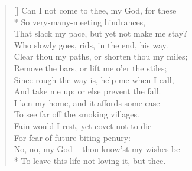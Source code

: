 \documentclass[MAIN]{subfiles}
\begin{document}
\settowidth{\versewidth}{Clear thou my paths, or shorten thou my miles;}
\begin{verse}[\versewidth]
Can I not come to thee, my God, for these\\*
So very-many-meeting hindrances,\\
That slack my pace, but yet not make me stay?\\
Who slowly goes, rids, in the end, his way.\\
Clear thou my paths, or shorten thou my miles;\\
Remove the bars, or lift me o'er the stiles;\\
Since rough the way is, help me when I call,\\
And take me up; or else prevent the fall.\\
I ken my home, and it affords some ease\\
To see far off the smoking villages.\\
Fain would I rest, yet covet not to die\\
For fear of future biting penury:\\
No, no, my God -- thou know'st my wishes be\\*
To leave this life not loving it, but thee.
\end{verse}
\end{document}
